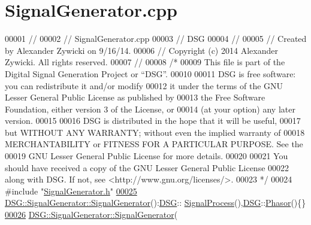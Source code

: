 \hypertarget{_signal_generator_8cpp_source}{\section{Signal\+Generator.\+cpp}
\label{_signal_generator_8cpp_source}
}

\begin{DoxyCode}
00001 \textcolor{comment}{//}
00002 \textcolor{comment}{//  SignalGenerator.cpp}
00003 \textcolor{comment}{//  DSG}
00004 \textcolor{comment}{//}
00005 \textcolor{comment}{//  Created by Alexander Zywicki on 9/16/14.}
00006 \textcolor{comment}{//  Copyright (c) 2014 Alexander Zywicki. All rights reserved.}
00007 \textcolor{comment}{//}
00008 \textcolor{comment}{/*}
00009 \textcolor{comment}{ This file is part of the Digital Signal Generation Project or “DSG”.}
00010 \textcolor{comment}{}
00011 \textcolor{comment}{ DSG is free software: you can redistribute it and/or modify}
00012 \textcolor{comment}{ it under the terms of the GNU Lesser General Public License as published by}
00013 \textcolor{comment}{ the Free Software Foundation, either version 3 of the License, or}
00014 \textcolor{comment}{ (at your option) any later version.}
00015 \textcolor{comment}{}
00016 \textcolor{comment}{ DSG is distributed in the hope that it will be useful,}
00017 \textcolor{comment}{ but WITHOUT ANY WARRANTY; without even the implied warranty of}
00018 \textcolor{comment}{ MERCHANTABILITY or FITNESS FOR A PARTICULAR PURPOSE.  See the}
00019 \textcolor{comment}{ GNU Lesser General Public License for more details.}
00020 \textcolor{comment}{}
00021 \textcolor{comment}{ You should have received a copy of the GNU Lesser General Public License}
00022 \textcolor{comment}{ along with DSG.  If not, see <http://www.gnu.org/licenses/>.}
00023 \textcolor{comment}{ */}
00024 \textcolor{preprocessor}{#include "\hyperlink{_signal_generator_8h}{SignalGenerator.h}"}
\hypertarget{_signal_generator_8cpp_source_l00025}{}\hyperlink{class_d_s_g_1_1_signal_generator_a13ebda67fcdc880ef41aff501cc23fc3}{00025} \hyperlink{class_d_s_g_1_1_signal_generator_a13ebda67fcdc880ef41aff501cc23fc3}{DSG::SignalGenerator::SignalGenerator}():\hyperlink{namespace_d_s_g}{DSG}::
      \hyperlink{class_d_s_g_1_1_signal_process}{SignalProcess}(),\hyperlink{namespace_d_s_g}{DSG}::\hyperlink{class_d_s_g_1_1_phasor}{Phasor}()\{\}
\hypertarget{_signal_generator_8cpp_source_l00026}{}\hyperlink{class_d_s_g_1_1_signal_generator_a4036fceff5c05a3711b8516d850c414c}{00026} \hyperlink{class_d_s_g_1_1_signal_generator_a13ebda67fcdc880ef41aff501cc23fc3}{DSG::SignalGenerator::SignalGenerator}(

\end{DoxyCode}
